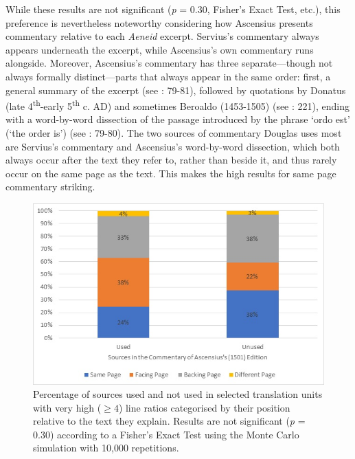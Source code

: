 \documentclass{dhbenelux}
\begin{document}
While these results are not significant (\emph{p} = 0.30, Fisher's Exact
Test, etc.), this preference is nevertheless noteworthy considering how
Ascensius presents commentary relative to each \emph{Aeneid} excerpt.
Servius's commentary always appears underneath the excerpt, while
Ascensius's own commentary runs alongside. Moreover, Ascensius's
commentary has three separate---though not always formally
distinct---parts that always appear in the same order: first, a general
summary of the excerpt (see \citeauthor{white2013} \citeyear{white2013}: 79-81), followed by quotations
by Donatus (late 4\textsuperscript{th}-early 5\textsuperscript{th} c.
AD) and sometimes Beroaldo (1453-1505) (see \citeauthor{white2013} \citeyear{white2013}: 221), ending
with a word-by-word dissection of the passage introduced by the phrase
`ordo est' (`the order is') (see \citeauthor{white2013} \citeyear{white2013}: 79-80). The two sources of
commentary Douglas uses most are Servius's commentary and Ascensius's
word-by-word dissection, which both always occur after the text they
refer to, rather than beside it, and thus rarely occur on the same page
as the text. This makes the high results for same page commentary
striking.

\begin{figure}[H]
\begin{center}
\includegraphics[width=1\linewidth]{Images/Figure9.jpg}
\end{center}
\caption{Percentage of sources used and not used in selected translation units with very high ($\geq 4$) line ratios categorised by their position relative to the text they explain.  Results are not significant (\emph{p} = 0.30) according to a Fisher’s Exact Test using the Monte Carlo simulation with 10,000 repetitions.}
\label{fig:figure9}
\end{figure}
\end{document}
